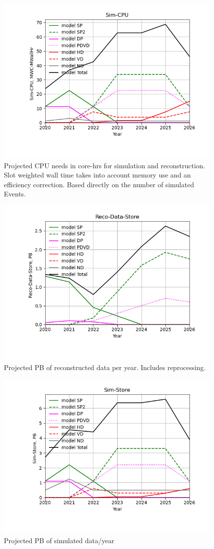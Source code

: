 \begin{figure}[h]
\centering\includegraphics[height=0.4\textwidth]{MoreSim_2022-12-04-2026/MoreSim_2022-12-04-2026-Sim-CPU.png}
\caption{Projected CPU needs in core-hrs for simulation and reconstruction.              Slot weighted wall time takes into account memory use and an efficiency correction. Based directly on the number of simulated Events.}
\label{fig:Sim-CPU}
\end{figure}
\begin{figure}[h]
\centering\includegraphics[height=0.4\textwidth]{MoreSim_2022-12-04-2026/MoreSim_2022-12-04-2026-Reco-Data-Store.png}
\caption{Projected PB of reconstructed data per year. Includes reprocessing.}
\label{fig:Reco-Data-Store}
\end{figure}
\begin{figure}[h]
\centering\includegraphics[height=0.4\textwidth]{MoreSim_2022-12-04-2026/MoreSim_2022-12-04-2026-Sim-Store.png}
\caption{Projected PB of simulated data/year}
\label{fig:Sim-Store}
\end{figure}
